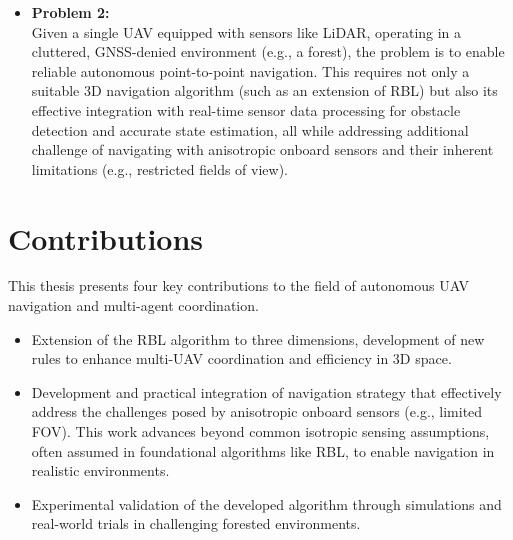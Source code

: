 \begin{enumerate}
      \begin{itemize}
        \item \textbf{Problem 2: } \\
        Given a single \ac{UAV} equipped with sensors like \ac{LiDAR}, operating in a cluttered, GNSS-denied environment (e.g., a forest), the problem is to enable reliable autonomous point-to-point navigation. 
        This requires not only a suitable 3D navigation algorithm (such as an extension of \ac{RBL}) but also its effective integration with real-time sensor data processing for obstacle detection and accurate state estimation, all while addressing additional challenge of navigating with anisotropic onboard sensors and their inherent limitations (e.g., restricted fields of view).
      \end{itemize}
  \end{enumerate}

\section{Contributions}
  This thesis presents four key contributions to the field of autonomous \ac{UAV} navigation and multi-agent coordination.
  \begin{itemize}
    \item Extension of the \ac{RBL} algorithm to three dimensions, development of new rules to enhance multi-\ac{UAV} coordination and efficiency in 3D space.
    \item Development and practical integration of navigation strategy that effectively address the challenges posed by anisotropic onboard sensors (e.g., limited \ac{FOV}). 
    This work advances beyond common isotropic sensing assumptions, often assumed in foundational algorithms like \ac{RBL}, to enable navigation in realistic environments.
    \item Experimental validation of the developed algorithm through simulations and real-world trials in challenging forested environments.
  \end{itemize}


